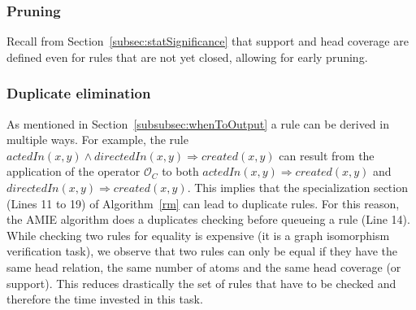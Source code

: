 % 


\subsubsection{Pruning} 
\label{subsubsec:pruning}
Recall from Section~\ref{subsec:statSignificance} that support and head coverage are defined even for rules that are not yet closed, allowing for early pruning.

\subsubsection{Duplicate elimination} 
\label{subsubsec:duplicateElimination}
As mentioned in Section~\ref{subsubsec:whenToOutput} a rule can be derived in multiple ways.
For example, the rule $actedIn(x,y) \wedge directedIn(x,y) \Rightarrow created(x,y)$ can result from the application
of the operator $\mathcal{O}_C$ to both $actedIn(x,y) \Rightarrow created(x,y)$ and $directedIn(x,y) \Rightarrow created(x,y)$.
This implies that the specialization section (Lines 11 to 19) of Algorithm~\ref{rm} can lead to duplicate rules.
For this reason, the AMIE algorithm does a duplicates checking before queueing a rule (Line 14). 
While checking two rules for equality is expensive (it is a graph isomorphism verification task), 
we observe that two rules can only be equal if they have the same head relation, the same number of atoms and
the same head coverage (or support). This reduces drastically the set of rules that have to be checked and therefore
the time invested in this task. 

